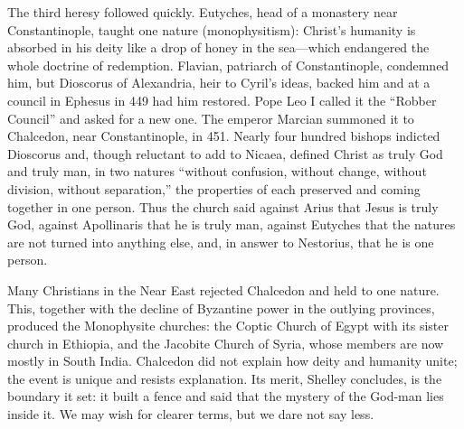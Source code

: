 The third heresy followed quickly. Eutyches, head of a monastery near Constantinople, taught one
nature (monophysitism): Christ's humanity is absorbed in his deity like a drop of honey in the
sea---which endangered the whole doctrine of redemption. Flavian, patriarch of Constantinople, condemned
him, but Dioscorus of Alexandria, heir to Cyril's ideas, backed him and at a council in Ephesus in
449 had him restored. Pope Leo I called it the ``Robber Council'' and asked for a new one. The emperor
Marcian summoned it to Chalcedon, near Constantinople, in 451. Nearly four hundred bishops indicted
Dioscorus and, though reluctant to add to Nicaea, defined Christ as truly God and truly man, in two
natures ``without confusion, without change, without division, without separation,'' the properties
of each preserved and coming together in one person. Thus the church said against Arius that Jesus
is truly God, against Apollinaris that he is truly man, against Eutyches that the natures are not turned into anything else, and, in answer to Nestorius, that he is one person.

Many Christians in the Near East rejected Chalcedon and held to one nature. This, together with the
decline of Byzantine power in the outlying provinces, produced the Monophysite churches: the Coptic
Church of Egypt with its sister church in Ethiopia, and the Jacobite Church of Syria, whose members
are now mostly in South India. Chalcedon did not explain how deity and humanity unite; the event is
unique and resists explanation. Its merit, Shelley concludes, is the boundary it set: it built a
fence and said that the mystery of the God-man lies inside it. We may wish for clearer terms, but we
dare not say less.

\begin{keyfacts}
\end{keyfacts}
